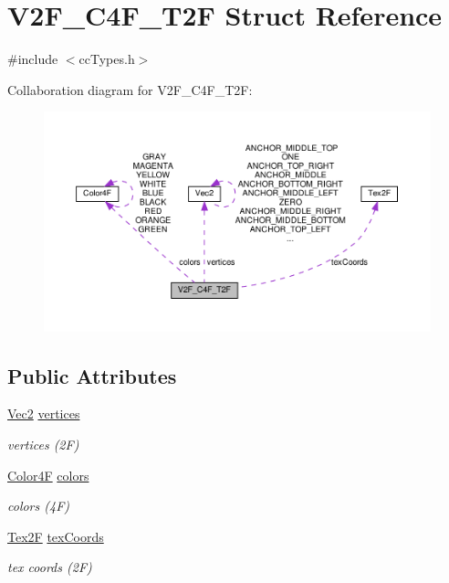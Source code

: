 \hypertarget{structV2F__C4F__T2F}{}\section{V2\+F\+\_\+\+C4\+F\+\_\+\+T2F Struct Reference}
\label{structV2F__C4F__T2F}


{\ttfamily \#include $<$cc\+Types.\+h$>$}



Collaboration diagram for V2\+F\+\_\+\+C4\+F\+\_\+\+T2F\+:
\nopagebreak
\begin{figure}[H]
\begin{center}
\leavevmode
\includegraphics[width=350pt]{structV2F__C4F__T2F__coll__graph}
\end{center}
\end{figure}
\subsection*{Public Attributes}
\begin{DoxyCompactItemize}
\item 
\mbox{\label{structV2F__C4F__T2F_a3b9129a47ac2344cdb68d72933adcbb5}} 
\hyperlink{classVec2}{Vec2} \hyperlink{structV2F__C4F__T2F_a3b9129a47ac2344cdb68d72933adcbb5}{vertices}
\begin{DoxyCompactList}\small\item\em vertices (2F) \end{DoxyCompactList}\item 
\mbox{\label{structV2F__C4F__T2F_ad4e6c72166201bc50723e7f829a499ca}} 
\hyperlink{structColor4F}{Color4F} \hyperlink{structV2F__C4F__T2F_ad4e6c72166201bc50723e7f829a499ca}{colors}
\begin{DoxyCompactList}\small\item\em colors (4F) \end{DoxyCompactList}\item 
\mbox{\label{structV2F__C4F__T2F_ada48d69cbef773f3748d7ed0d162389a}} 
\hyperlink{structTex2F}{Tex2F} \hyperlink{structV2F__C4F__T2F_ada48d69cbef773f3748d7ed0d162389a}{tex\+Coords}
\begin{DoxyCompactList}\small\item\em tex coords (2F) \end{DoxyCompactList}\end{DoxyCompactItemize}


